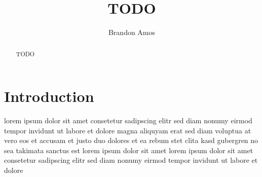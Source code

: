 \documentclass[11pt]{article}
\title{TODO}
\author{Brandon Amos}
\begin{document}
\maketitle


\begin{abstract}
TODO
\end{abstract}

\section{Introduction}
lorem ipsum dolor sit amet consetetur sadipscing elitr sed diam nonumy
eirmod tempor invidunt ut labore et dolore magna aliquyam erat sed diam
voluptua at vero eos et accusam et justo duo dolores et ea rebum stet clita
kasd gubergren no sea takimata sanctus est lorem ipsum dolor sit amet lorem
ipsum dolor sit amet consetetur sadipscing elitr sed diam nonumy eirmod
tempor invidunt ut labore et dolore \citep{article}



\end{document}
